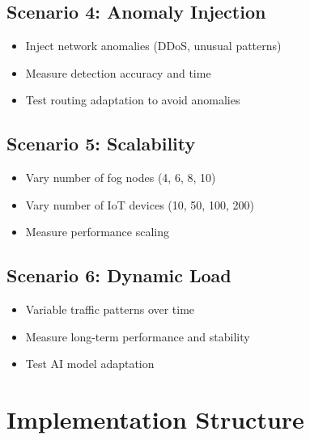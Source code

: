 \documentclass[11pt,a4paper]{article}
\begin{document}
\subsection{Scenario 4: Anomaly Injection}
\begin{itemize}
    \item Inject network anomalies (DDoS, unusual patterns)
    \item Measure detection accuracy and time
    \item Test routing adaptation to avoid anomalies
\end{itemize}

\subsection{Scenario 5: Scalability}
\begin{itemize}
    \item Vary number of fog nodes (4, 6, 8, 10)
    \item Vary number of IoT devices (10, 50, 100, 200)
    \item Measure performance scaling
\end{itemize}

\subsection{Scenario 6: Dynamic Load}
\begin{itemize}
    \item Variable traffic patterns over time
    \item Measure long-term performance and stability
    \item Test AI model adaptation
\end{itemize}

\section{Implementation Structure}
\end{document}
